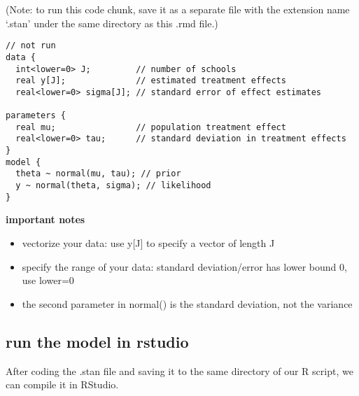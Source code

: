 \documentclass[]{article}
\providecommand{\tightlist}{%
  \setlength{\itemsep}{0pt}\setlength{\parskip}{0pt}}
\begin{document}
(Note: to run this code chunk, save it as a separate file with the
extension name `.stan' under the same directory as this .rmd file.)

\begin{verbatim}
// not run
data {
  int<lower=0> J;         // number of schools 
  real y[J];              // estimated treatment effects
  real<lower=0> sigma[J]; // standard error of effect estimates 

parameters {
  real mu;                // population treatment effect
  real<lower=0> tau;      // standard deviation in treatment effects
}
model {
  theta ~ normal(mu, tau); // prior
  y ~ normal(theta, sigma); // likelihood
}
\end{verbatim}

\textbf{important notes}

\begin{itemize}
\tightlist
\item
  vectorize your data: use y{[}J{]} to specify a vector of length J
\item
  specify the range of your data: standard deviation/error has lower
  bound 0, use lower=0
\item
  the second parameter in normal() is the standard deviation, not the
  variance
\end{itemize}

\subsection{run the model in rstudio}\label{run-the-model-in-rstudio}

After coding the .stan file and saving it to the same directory of our R
script, we can compile it in RStudio.
\end{document}
